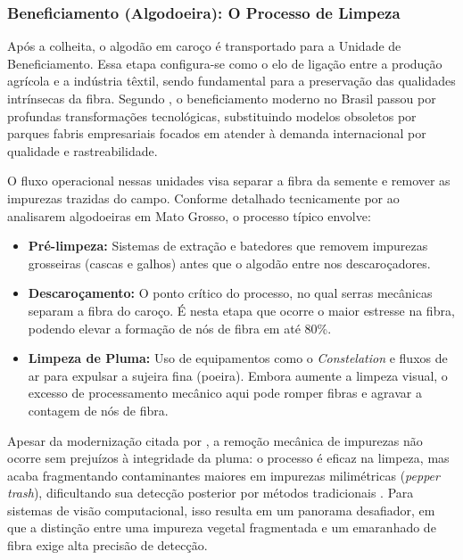     \subsubsection{Beneficiamento (Algodoeira): O Processo de Limpeza}

        Após a colheita, o algodão em caroço é transportado para a Unidade de Beneficiamento. Essa etapa configura-se como o elo de ligação entre a produção agrícola e a indústria têxtil, sendo fundamental para a preservação das qualidades intrínsecas da fibra. Segundo , o beneficiamento moderno no Brasil passou por profundas transformações tecnológicas, substituindo modelos obsoletos por parques fabris empresariais focados em atender à demanda internacional por qualidade e rastreabilidade.

        O fluxo operacional nessas unidades visa separar a fibra da semente e remover as impurezas trazidas do campo. Conforme detalhado tecnicamente por  ao analisarem algodoeiras em Mato Grosso, o processo típico envolve:

        \begin{itemize}
            \item \textbf{Pré-limpeza:} Sistemas de extração e batedores que removem impurezas grosseiras (cascas e galhos) antes que o algodão entre nos descaroçadores.
            
            \item \textbf{Descaroçamento:} O ponto crítico do processo, no qual serras mecânicas separam a fibra do caroço. É nesta etapa que ocorre o maior estresse na fibra, podendo elevar a formação de nós de fibra em até 80\%.

            \item \textbf{Limpeza de Pluma:} Uso de equipamentos como o \textit{Constelation} e fluxos de ar para expulsar a sujeira fina (poeira). Embora aumente a limpeza visual, o excesso de processamento mecânico aqui pode romper fibras e agravar a contagem de nós de fibra.
        \end{itemize}

        Apesar da modernização citada por , a remoção mecânica de impurezas não ocorre sem prejuízos à integridade da pluma: o processo é eficaz na limpeza, mas acaba fragmentando contaminantes maiores em impurezas milimétricas (\textit{pepper trash}), dificultando sua detecção posterior por métodos tradicionais \cite{mustafic2016}. Para sistemas de visão computacional, isso resulta em um panorama desafiador, em que a distinção entre uma impureza vegetal fragmentada e um emaranhado de fibra exige alta precisão de detecção.


